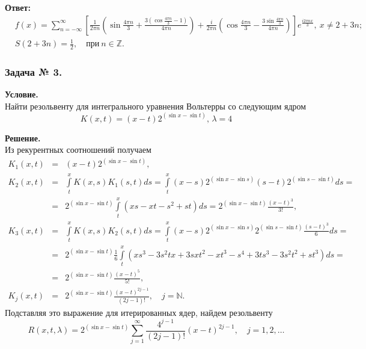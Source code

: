 \noindent
\textbf{Ответ:}
\[
\begin{split}
	&f(x)=\sum_{n=-\infty}^\infty\left[ \frac{1}{2\pi n} \left( \sin\frac{4 \pi n}{3} + \frac{3(\cos\frac{4\pi n}{3} - 1)}{4\pi n} \right) + \frac{i}{2\pi n} \left( \cos\frac{4\pi n}{3} - \frac{3\sin\frac{4\pi n}{3}}{4\pi n} \right) \right] e^{\tfrac{i2\pi nx}{3}},~ x\ne 2+3n; \\
	&S(2+3n)=\frac{1}{2},\quad\text{при}~n\in\mathbb{Z}.
\end{split}
\]


\subsubsection*{\center Задача № 3.}
{\bf Условие.~}\\
Найти резольвенту для интегрального уравнения Вольтерры со следующим ядром 
$$K(x,t)=(x-t)2^{(\sin{x}-\sin{t})},\,\lambda=4$$

\noindent
{\bf Решение.~}\\
\noindent
Из рекурентных соотношений получаем
$$
\begin{array}{rcl}
	K_1(x,t)&=&\displaystyle (x-t)2^{(\sin x - \sin t)}, \\[12pt]
	K_2(x,t)&=&\displaystyle\int\limits_t^x K(x,s)K_1(s,t)ds = \int\limits_t^x (x-s)2^{(\sin x - \sin s)} (s-t)2^{(\sin s - \sin t)} ds = \\[12pt]
	&=&\displaystyle 2^{(\sin x - \sin t)}\int\limits_t^x (xs - xt - s^{2} +st)ds = 2^{(\sin x -\sin t)} \frac{(x-t)^{3}}{3!},\\[12pt]
	K_3(x,t)&=&\displaystyle\int\limits_t^x K(x,s)K_2(s,t)ds = \int\limits_t^x (x-s)2^{(\sin x - \sin s)}2^{(\sin s - \sin t)} \frac{(s-t)^{3}}{6}ds = \\[12pt]
	&=&\displaystyle 2^{(\sin x - \sin t)} \frac{1}{6} \int\limits_t^x (xs^{3}-3s^{2}tx+3sxt^{2} -xt^{3} - s^{4} +3ts^{3} -3s^{2}t^{2}+st^{3})ds =  \\[12pt]
	&=&\displaystyle 2^{(\sin x -\sin t)} \frac{(x-t)^{5}}{5!},  \\[12pt]
	K_j(x,t)&=&\displaystyle 2^{(\sin x -\sin t)} \frac{(x-t)^{2j-1}}{\left(2j-1\right)!}  \!,\quad j=\mathbb{N}.
\end{array}
$$
Подставляя это выражение для итерированных ядер, найдем резольвенту
$$ 
R(x,t,\lambda)= 2^{(\sin x - \sin t)} \sum_{j=1}^\infty \frac{4^{j-1}}{(2j-1)!}\left( x-t \right)^{2j-1}\!\!\!\!\!\!\!\!,
\quad j=1,2,\ldots
$$

